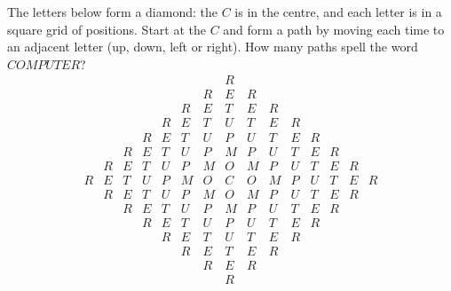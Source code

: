 The letters below form a diamond: the $C$ is in the centre, and each letter is in a square grid of positions. Start at the $C$ and form a path by moving each time to an adjacent letter (up, down, left or right). How many paths spell the word $COMPUTER$?
\[
\begin{array}{ccccccccccccccc}
&&&&&&&R&&&&&&&\\
&&&&&&R&E&R&&&&&&\\
&&&&&R&E&T&E&R&&&&&\\
&&&&R&E&T&U&T&E&R&&&&\\
&&&R&E&T&U&P&U&T&E&R&&&\\
&&R&E&T&U&P&M&P&U&T&E&R&&\\
&R&E&T&U&P&M&O&M&P&U&T&E&R&\\
R&E&T&U&P&M&O&C&O&M&P&U&T&E&R\\
&R&E&T&U&P&M&O&M&P&U&T&E&R&\\
&&R&E&T&U&P&M&P&U&T&E&R&&\\
&&&R&E&T&U&P&U&T&E&R&&&\\
&&&&R&E&T&U&T&E&R&&&&\\
&&&&&R&E&T&E&R&&&&&\\
&&&&&&R&E&R&&&&&&\\
&&&&&&&R&&&&&&&
\end{array}
\]

